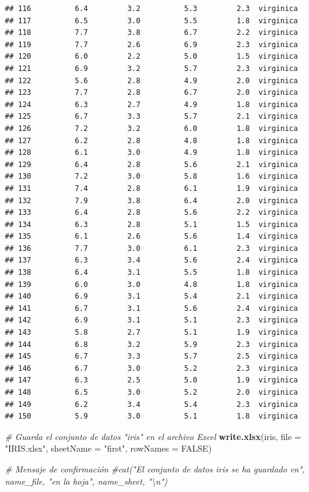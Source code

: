 \documentclass[
]{article}
\newenvironment{Shaded}{\begin{snugshade}}{\end{snugshade}}
\newcommand{\AttributeTok}[1]{\textcolor[rgb]{0.13,0.29,0.53}{#1}}
\newcommand{\CommentTok}[1]{\textcolor[rgb]{0.56,0.35,0.01}{\textit{#1}}}
\newcommand{\ConstantTok}[1]{\textcolor[rgb]{0.56,0.35,0.01}{#1}}
\newcommand{\FunctionTok}[1]{\textcolor[rgb]{0.13,0.29,0.53}{\textbf{#1}}}
\newcommand{\NormalTok}[1]{#1}
\newcommand{\StringTok}[1]{\textcolor[rgb]{0.31,0.60,0.02}{#1}}
\begin{document}
\begin{verbatim}
## 116          6.4         3.2          5.3         2.3  virginica
## 117          6.5         3.0          5.5         1.8  virginica
## 118          7.7         3.8          6.7         2.2  virginica
## 119          7.7         2.6          6.9         2.3  virginica
## 120          6.0         2.2          5.0         1.5  virginica
## 121          6.9         3.2          5.7         2.3  virginica
## 122          5.6         2.8          4.9         2.0  virginica
## 123          7.7         2.8          6.7         2.0  virginica
## 124          6.3         2.7          4.9         1.8  virginica
## 125          6.7         3.3          5.7         2.1  virginica
## 126          7.2         3.2          6.0         1.8  virginica
## 127          6.2         2.8          4.8         1.8  virginica
## 128          6.1         3.0          4.9         1.8  virginica
## 129          6.4         2.8          5.6         2.1  virginica
## 130          7.2         3.0          5.8         1.6  virginica
## 131          7.4         2.8          6.1         1.9  virginica
## 132          7.9         3.8          6.4         2.0  virginica
## 133          6.4         2.8          5.6         2.2  virginica
## 134          6.3         2.8          5.1         1.5  virginica
## 135          6.1         2.6          5.6         1.4  virginica
## 136          7.7         3.0          6.1         2.3  virginica
## 137          6.3         3.4          5.6         2.4  virginica
## 138          6.4         3.1          5.5         1.8  virginica
## 139          6.0         3.0          4.8         1.8  virginica
## 140          6.9         3.1          5.4         2.1  virginica
## 141          6.7         3.1          5.6         2.4  virginica
## 142          6.9         3.1          5.1         2.3  virginica
## 143          5.8         2.7          5.1         1.9  virginica
## 144          6.8         3.2          5.9         2.3  virginica
## 145          6.7         3.3          5.7         2.5  virginica
## 146          6.7         3.0          5.2         2.3  virginica
## 147          6.3         2.5          5.0         1.9  virginica
## 148          6.5         3.0          5.2         2.0  virginica
## 149          6.2         3.4          5.4         2.3  virginica
## 150          5.9         3.0          5.1         1.8  virginica
\end{verbatim}

\begin{Shaded}
\begin{Highlighting}[]
\CommentTok{\# Guarda el conjunto de datos "iris" en el archivo Excel}
\FunctionTok{write.xlsx}\NormalTok{(iris, }\AttributeTok{file =} \StringTok{"IRIS.xlsx"}\NormalTok{, }\AttributeTok{sheetName =} \StringTok{"first"}\NormalTok{, }\AttributeTok{rowNames =} \ConstantTok{FALSE}\NormalTok{)}

\CommentTok{\# Mensaje de confirmación}
\CommentTok{\#cat("El conjunto de datos iris se ha guardado en", name\_file, "en la hoja", name\_sheet, "\textbackslash{}n")}
\end{Highlighting}
\end{Shaded}
\end{document}

